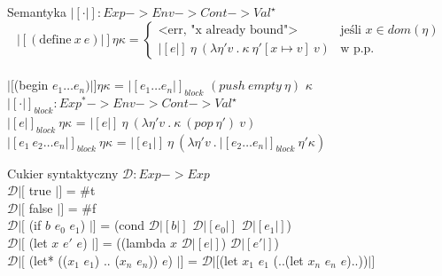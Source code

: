 \documentclass[12pt,serif]{beamer}
\begin{document}
\begin{frame}{Semantyka}
$|[ \cdot |]: Exp -> Env -> Cont -> Val^{\star}$ \newline
\\
\[
 |[(\text{define}~x~e)|] \eta \kappa =
  \begin{cases}
   \text{<err, "x already bound">} & \text{jeśli } x \in dom(\eta) \\
   |[e|] ~ \eta ~ (\lambda \eta' v ~. ~ \kappa ~ \eta'[x \mapsto v] ~ v) & \text{w p.p.}
  \end{cases}
\] \newline
\\
$|[$(begin $e_1 \ldots e_n)|] \eta \kappa$ =
  $|[e_1 \ldots e_n|]_{block}$ $(push~empty~\eta)$ $\kappa$ \newline
\\
$|[ \cdot |]_{block}: Exp^{*} -> Env -> Cont -> Val^{\star}$ \newline
\\
$|[ e |]_{block} ~\eta \kappa$ =
  $|[ e |] ~ \eta ~ (\lambda \eta' v ~ . ~ \kappa ~ (pop~\eta') ~ v)$ \\
$|[ e_1 ~ e_2 \ldots e_n |]_{block} ~\eta \kappa$ =
  $|[ e_1 |] ~ \eta ~ (\lambda \eta' v ~ . ~ |[ e_2 \ldots e_n |]_{block} ~ \eta' \kappa )$ \\
\end{frame}


\begin{frame}{Cukier syntaktyczny}
$\mathcal{D} : Exp -> Exp$ \newline
\\
$\mathcal{D}|[$ true $|]$ = \#t \\
$\mathcal{D}|[$ false $|]$ = \#f \newline
\\
$\mathcal{D}|[$ (if $b$ $e_0$ $e_1$) $|]$ =
   (cond $\mathcal{D}|[ b |]$ $\mathcal{D}|[ e_0 |]$ $\mathcal{D}|[ e_1 |]$) \newline
\\
$\mathcal{D}|[$ (let $x$ $e'$ $e$) $|]$ =
   ((lambda $x$ $\mathcal{D}|[e|]$) $\mathcal{D}|[e'|]$) \\
$\mathcal{D}|[$ (let* (($x_1$ $e_1$) .. ($x_n$ $e_n$)) $e$) $|]$ = 
   $\mathcal{D}|[$(let $x_1$ $e_1$ (..(let $x_n$ $e_n$ $e$)..))$|]$ \\
\end{frame}
\end{document}
